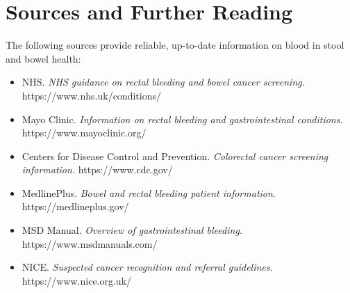 \section*{Sources and Further Reading}
The following sources provide reliable, up-to-date information on blood in stool and bowel health:

\begin{itemize}
    \item NHS. \textit{NHS guidance on rectal bleeding and bowel cancer screening.} https://www.nhs.uk/conditions/
    \item Mayo Clinic. \textit{Information on rectal bleeding and gastrointestinal conditions.} https://www.mayoclinic.org/
    \item Centers for Disease Control and Prevention. \textit{Colorectal cancer screening information.} https://www.cdc.gov/
    \item MedlinePlus. \textit{Bowel and rectal bleeding patient information.} https://medlineplus.gov/
    \item MSD Manual. \textit{Overview of gastrointestinal bleeding.} https://www.msdmanuals.com/
    \item NICE. \textit{Suspected cancer recognition and referral guidelines.} https://www.nice.org.uk/
\end{itemize}
